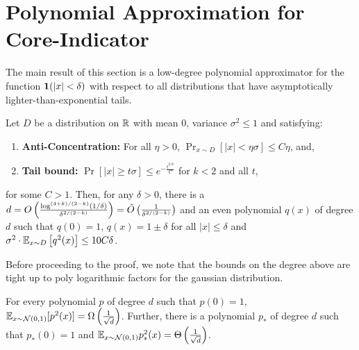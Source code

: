 


\section{Polynomial Approximation for Core-Indicator}
\label{appendix:polyfact}


The main result of this section is a low-degree polynomial approximator for the function $\bm{1}(|x| < \delta)$ with respect to all distributions that have asymptotically lighter-than-exponential tails.  


\begin{lemma}\label{lem:univppty_box} 
Let $D$ be a distribution on $\mathbb R$ with mean $0$, variance $\sigma^2 \leq 1$ and satisfying:
\begin{enumerate}
    \item \textbf{Anti-Concentration:} For all $\eta > 0$, $\Pr_{x \sim D} [ |x| < \eta \sigma] \leq C\eta$, and,
    \item \textbf{Tail bound:} $\Pr[ |x| \geq t \sigma] \leq e^{-\frac{t^{2/k}}{C}}$ for $k <2$ and all $t$,
\end{enumerate} 
for some $C>1$. Then, for any $\delta > 0$, there is a $d = O\left(\frac{\log^{(4+k)/(2-k)}(1/\delta)}{\delta^{2/(2-k)}}\right)= \tilde{O}\left(\frac{1}{\delta^{2/(2-k)}}\right)$ and an even polynomial $q(x)$ of degree $d$ such that $q(0) = 1$, $q(x)= 1 \pm \delta$ for all $|x| \leq \delta$ and $\sigma^2 \cdot \mathbb{E}_{x \sim D}\left[ q^2(x) \right] \leq 10C\delta$.
\end{lemma}

Before proceeding to the proof, we note that the bounds on the degree above are tight up to poly logarithmic factors for the gaussian distribution. 

\begin{lemma} \label{lem:tightness-gaussian}
For every polynomial $p$ of degree $d$ such that $p(0)= 1$, $\mathbb{E}_{x \sim \mathcal N(0,1)} [ p^2(x)] = \Omega\left(\frac{1}{\sqrt{d}} \right)$. Further, there is a polynomial $p_*$ of degree $d$ such  that $p_{*}(0) = 1$ and $\mathbb{E}_{x \sim \mathcal N(0,1)} p_{*}^2(x) = \Theta\left(\frac{1}{\sqrt{d}}\right)$.
\end{lemma}

